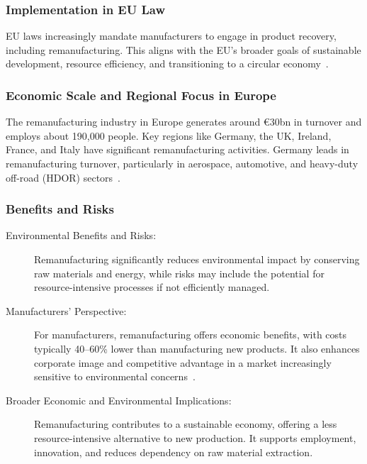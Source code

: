 \subsubsection{Implementation in EU Law}
EU laws increasingly mandate manufacturers to engage in product recovery, including remanufacturing. This aligns with the EU's broader goals of sustainable development, resource efficiency, and transitioning to a circular economy~\cite{eu2015reman,eu2019greendeal}.

\subsubsection{Economic Scale and Regional Focus in Europe}
The remanufacturing industry in Europe generates around €30bn in turnover and employs about 190,000 people. Key regions like Germany, the UK, Ireland, France, and Italy have significant remanufacturing activities. Germany leads in remanufacturing turnover, particularly in aerospace, automotive, and heavy-duty off-road (HDOR) sectors~\cite{eu2015reman}.

\subsubsection{Benefits and Risks}
\begin{description}
    \item[Environmental Benefits and Risks:] Remanufacturing significantly reduces environmental impact by conserving raw materials and energy, while risks may include the potential for resource-intensive processes if not efficiently managed.
    \item[Manufacturers' Perspective:] For manufacturers, remanufacturing offers economic benefits, with costs typically 40–60\% lower than manufacturing new products. It also enhances corporate image and competitive advantage in a market increasingly sensitive to environmental concerns~\cite{mitra2005reman}.
    \item[Broader Economic and Environmental Implications:] Remanufacturing contributes to a sustainable economy, offering a less resource-intensive alternative to new production. It supports employment, innovation, and reduces dependency on raw material extraction.
\end{description}

